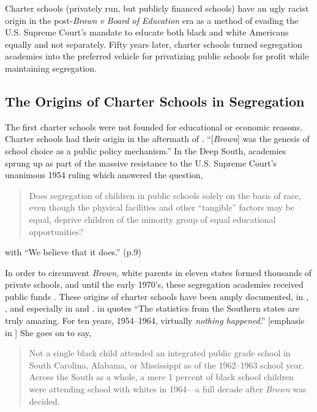 Charter schools (privately run, but publicly financed schools) have an ugly racist origin in the post-\textit{Brown v Board of Education} era as a method of evading the U.S. Supreme Court's mandate to educate both black and white Americans equally and not separately. Fifty years later, charter schools turned segregation academies into the preferred vehicle for privatizing public schools for profit while maintaining segregation.

\subsection{The Origins of Charter Schools in Segregation}\label{sec:origins}\indent

The first charter schools were not founded for educational or economic reasons. Charter schools had their origin in the aftermath of \textit{}. ``[\textit{Brown}] was the genesis of school choice as a public policy mechanism.'' \parencite[8]{Garcia2018} In the Deep South, academies sprung up as part of the massive resistance to the U.S. Supreme Court's unanimous 1954 ruling which answered the question,

\begin{quote}\OnehalfSpacing%
Does segregation of children in public schools solely on the basis of race, even though the physical facilities and other ``tangible'' factors may be equal, deprive children of the minority group of equal educational opportunities? 
\end{quote}

\noindent{} with ``We believe that it does.'' (p.9)
  
In order to circumvent \textit{Brown}, white parents in eleven states formed thousands of private schools, and until the early 1970's, these segregation academies received public funds \parencite%
  {Rooks2017}. These origins of  charter schools have been amply documented, in \textcite{Frankenberg.etal2010}, \textcite{Frankenberg.etal2011}, and especially in \textcite{Suitts2019} and \textcite{Suitts2020}. \citeauthor{Alexander2011} in  quotes \textcite[52]{Rosenberg1991} ``The statistics from the Southern states are truly amazing. For ten years, 1954–1964, virtually \textit{nothing happened}.'' [emphasis in \parencite[223]{Alexander2011}] She goes on to say, 

\begin{quote}\OnehalfSpacing%
Not a single black child attended an integrated public grade school in South Carolina, Alabama, or Mississippi as of the 1962–1963 school year. Across the South as a whole, a mere 1 percent of black school children were attending school with whites in 1964—a full decade after \textit{Brown} was decided.
 \end{quote}

